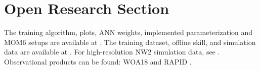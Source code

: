 \documentclass[draft]{agujournal2019}
\begin{document}




%
%
\section*{Open Research Section}
The training algorithm, plots, ANN weights, implemented parameterization and MOM6 setups are available at . The training dataset, offline skill, and simulation data are available at . For high-resolution NW2 simulation data, see . Observational products can be found: WOA18 \cite{WOA18data} and RAPID \cite{RAPIDdata}.

\end{document}
